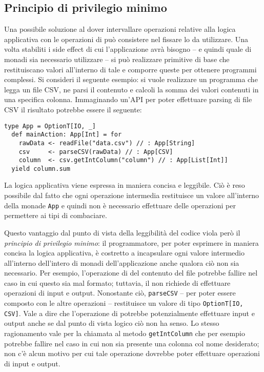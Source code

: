 \subsection{Principio di privilegio minimo}
Una possibile soluzione al dover intervallare operazioni relative alla logica applicativa con le operazioni di  può consistere nel fissare lo  da utilizzare. Una volta stabiliti i side effect di cui l'applicazione avrà bisogno -- e quindi quale  di monadi sia necessario utilizzare -- si può realizzare primitive di base che restituiscano valori all'interno di tale  e comporre queste per ottenere programmi complessi. Si consideri il seguente esempio: si vuole realizzare un programma che legga un file CSV, ne parsi il contenuto e calcoli la somma dei valori contenuti in una specifica colonna. Immaginando un'API per poter effettuare parsing di file CSV il risultato potrebbe essere il seguente:
\begin{lstlisting}[language=scala3]
  type App = OptionT[IO, _]
  def mainAction: App[Int] = for
    rawData <- readFile("data.csv") // : App[String]
    csv     <- parseCSV(rawData) // : App[CSV]
    column  <- csv.getIntColumn("column") // : App[List[Int]]
  yield column.sum
\end{lstlisting}
La logica applicativa viene espressa in maniera concisa e leggibile. Ciò è reso possibile dal fatto che ogni operazione intermedia restituisce un valore all'interno della monade \lstinline{App} e quindi non è necessario effettuare  delle operazioni per permettere ai tipi di combaciare.

Questo vantaggio dal punto di vista della leggibilità del codice viola però il \emph{principio di privilegio minimo}: il programmatore, per poter esprimere in maniera concisa la logica applicativa, è costretto a incapsulare ogni valore intermedio all'interno dell'intero  di monadi dell'applicazione anche qualora ciò non sia necessario. Per esempio, l'operazione di  del contenuto del file potrebbe fallire nel caso in cui questo sia mal formato; tuttavia, il  non richiede di effettuare operazioni di input e output. Nonostante ciò, \lstinline{parseCSV} -- per poter essere composto con le altre operazioni -- restituisce un valore di tipo \lstinline{OptionT[IO, CSV]}. Vale a dire che l'operazione di  potrebbe potenzialmente effettuare input e output anche se dal punto di vista logico ciò non ha senso.
Lo stesso ragionamento vale per la chiamata al metodo \lstinline{getIntColumn} che per esempio potrebbe fallire nel caso in cui non sia presente una colonna col nome desiderato; non c'è alcun motivo per cui tale operazione dovrebbe poter effettuare operazioni di input e output.

